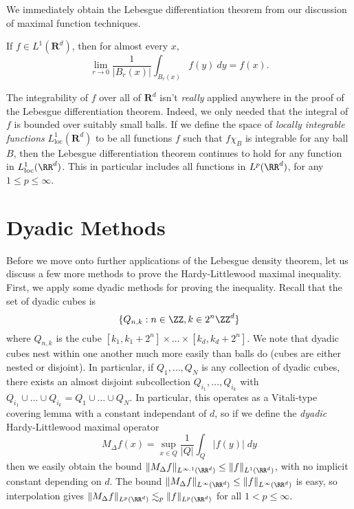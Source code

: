We immediately obtain the Lebesgue differentiation theorem from our discussion of maximal function techniques.

\begin{corollary}
    If $f \in L^1(\mathbf{R}^d)$, then for almost every $x$,
    \[ \lim_{r \to 0} \frac{1}{|B_r(x)|} \int_{B_r(x)} f(y)\ dy = f(x). \]
\end{corollary}

The integrability of $f$ over all of $\mathbf{R}^d$ isn't {\it really} applied anywhere in the proof of the Lebesgue differentiation theorem. Indeed, we only needed that the integral of $f$ is bounded over suitably small balls. If we define the space of \emph{locally integrable functions} $L^1_{\text{loc}}(\mathbf{R}^d)$ to be all functions $f$ such that $f \chi_B$ is integrable for any ball $B$, then the Lebesgue differentiation theorem continues to hold for any function in $L^1_{\text{loc}}(\RR^d)$. This in particular includes all functions in $L^p(\RR^d)$, for any $1 \leq p \leq \infty$.

\section{Dyadic Methods}

Before we move onto further applications of the Lebesgue density theorem, let us discuss a few more methods to prove the Hardy-Littlewood maximal inequality. First, we apply some dyadic methods for proving the inequality. Recall that the set of dyadic cubes is
%
\[ \{ Q_{n,k} : n \in \ZZ, k \in 2^n \ZZ^d \} \]
%
where $Q_{n,k}$ is the cube $[k_1, k_1 + 2^n] \times \dots \times [k_d, k_d + 2^n]$. We note that dyadic cubes nest within one another much more easily than balls do (cubes are either nested or disjoint). In particular, if $Q_1,\dots,Q_N$ is any collection of dyadic cubes, there exists an almost disjoint subcollection $Q_{i_1}, \dots, Q_{i_k}$ with $Q_{i_1} \cup \dots \cup Q_{i_k} = Q_1 \cup \dots \cup Q_N$. In particular, this operates as a Vitali-type covering lemma with a constant independant of $d$, so if we define the \emph{dyadic} Hardy-Littlewood maximal operator
%
\[ M_\Delta f(x) = \sup_{x \in Q} \frac{1}{|Q|} \int_Q |f(y)|\; dy \]
%
then we easily obtain the bound $\| M_\Delta f \|_{L^{\infty,1}(\RR^d)} \leq \| f \|_{L^1(\RR^d)}$, with no implicit constant depending on $d$. The bound $\| M_\Delta f \|_{L^\infty(\RR^d)} \leq \| f \|_{L^\infty(\RR^d)}$ is easy, so interpolation gives $\| M_\Delta f \|_{L^p(\RR^d)} \lesssim_p \| f \|_{L^p(\RR^d)}$ for all $1 < p \leq \infty$.

